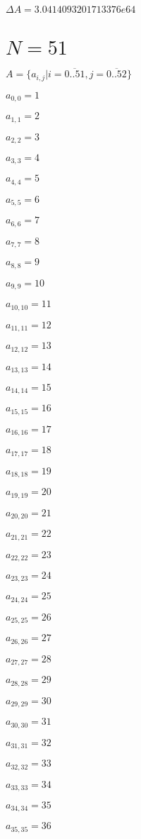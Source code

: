 \documentclass[a4paper,12pt]{article}
\begin{document}
$\Delta A = 3.0414093201713376e64$



\section{ $N = 51$ }
$A = \{ a _{ i, j } | i = \overline { 0..51 }, j = \overline { 0..52 } \}$

$a _{ 0, 0 } = 1$

$a _{ 1, 1 } = 2$

$a _{ 2, 2 } = 3$

$a _{ 3, 3 } = 4$

$a _{ 4, 4 } = 5$

$a _{ 5, 5 } = 6$

$a _{ 6, 6 } = 7$

$a _{ 7, 7 } = 8$

$a _{ 8, 8 } = 9$

$a _{ 9, 9 } = 10$

$a _{ 10, 10 } = 11$

$a _{ 11, 11 } = 12$

$a _{ 12, 12 } = 13$

$a _{ 13, 13 } = 14$

$a _{ 14, 14 } = 15$

$a _{ 15, 15 } = 16$

$a _{ 16, 16 } = 17$

$a _{ 17, 17 } = 18$

$a _{ 18, 18 } = 19$

$a _{ 19, 19 } = 20$

$a _{ 20, 20 } = 21$

$a _{ 21, 21 } = 22$

$a _{ 22, 22 } = 23$

$a _{ 23, 23 } = 24$

$a _{ 24, 24 } = 25$

$a _{ 25, 25 } = 26$

$a _{ 26, 26 } = 27$

$a _{ 27, 27 } = 28$

$a _{ 28, 28 } = 29$

$a _{ 29, 29 } = 30$

$a _{ 30, 30 } = 31$

$a _{ 31, 31 } = 32$

$a _{ 32, 32 } = 33$

$a _{ 33, 33 } = 34$

$a _{ 34, 34 } = 35$

$a _{ 35, 35 } = 36$
\end{document}
